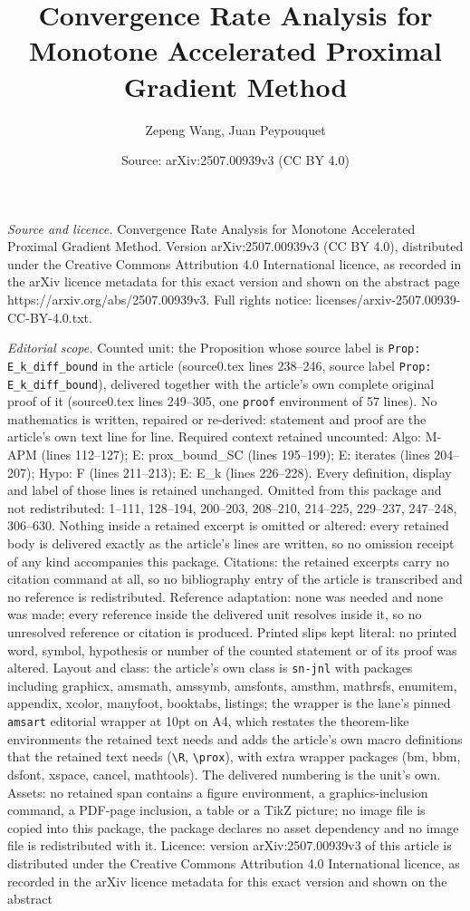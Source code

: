 \documentclass[10pt,a4paper]{amsart}
\title[Convergence Rate Analysis for Monotone Accelerated Proximal ]{Convergence Rate Analysis for Monotone Accelerated Proximal Gradient Method}
\author{Zepeng Wang, Juan Peypouquet}
\date{Source: arXiv:2507.00939v3 (CC BY 4.0)}
\begin{document}
\maketitle

\noindent\emph{Source and licence.} Convergence Rate Analysis for Monotone Accelerated Proximal Gradient Method. Version arXiv:2507.00939v3 (CC BY 4.0), distributed under the Creative Commons Attribution 4.0 International licence, as recorded in the arXiv licence metadata for this exact version and shown on the abstract page https://arxiv.org/abs/2507.00939v3. Full rights notice: licenses/arxiv-2507.00939-CC-BY-4.0.txt.\par\smallskip

\noindent\textit{Editorial scope.} Counted unit: the Proposition whose source label is \texttt{Prop: E\_k\_diff\_bound} in the article (source0.tex lines 238--246, source label \texttt{Prop: E\_k\_diff\_bound}), delivered together with the article's own complete original proof of it (source0.tex lines 249--305, one \texttt{proof} environment of 57 lines). No mathematics is written, repaired or re-derived: statement and proof are the article's own text line for line. Required context retained uncounted: Algo: M-APM (lines 112--127); E: prox\_bound\_SC (lines 195--199); E: iterates (lines 204--207); Hypo: F (lines 211--213); E: E\_k (lines 226--228). Every definition, display and label of those lines is retained unchanged. Omitted from this package and not redistributed: 1--111, 128--194, 200--203, 208--210, 214--225, 229--237, 247--248, 306--630. Nothing inside a retained excerpt is omitted or altered: every retained body is delivered exactly as the article's lines are written, so no omission receipt of any kind accompanies this package. Citations: the retained excerpts carry no citation command at all, so no bibliography entry of the article is transcribed and no reference is redistributed. Reference adaptation: none was needed and none was made; every reference inside the delivered unit resolves inside it, so no unresolved reference or citation is produced. Printed slips kept literal: no printed word, symbol, hypothesis or number of the counted statement or of its proof was altered. Layout and class: the article's own class is \texttt{sn-jnl} with packages including graphicx, amsmath, amssymb, amsfonts, amsthm, mathrsfs, enumitem, appendix, xcolor, manyfoot, booktabs, listings; the wrapper is the lane's pinned \texttt{amsart} editorial wrapper at 10pt on A4, which restates the theorem-like environments the retained text needs and adds the article's own macro definitions that the retained text needs (\texttt{\textbackslash R}, \texttt{\textbackslash prox}), with extra wrapper packages (bm, bbm, dsfont, xspace, cancel, mathtools). The delivered numbering is the unit's own. Assets: no retained span contains a figure environment, a graphics-inclusion command, a PDF-page inclusion, a table or a TikZ picture; no image file is copied into this package, the package declares no asset dependency and no image file is redistributed with it. Licence: version arXiv:2507.00939v3 of this article is distributed under the Creative Commons Attribution 4.0 International licence, as recorded in the arXiv licence metadata for this exact version and shown on the abstract 
\end{document}
